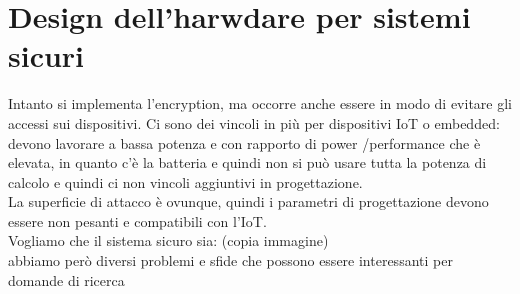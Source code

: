 \documentclass[oneside, 12pt]{extbook}
\begin{document}
\section{Design dell'harwdare per sistemi sicuri}
Intanto si implementa l'encryption, ma occorre anche essere in modo di evitare gli accessi sui dispositivi. Ci sono dei vincoli in più per dispositivi IoT o embedded: devono lavorare a bassa potenza e con rapporto di power /performance che è elevata, in quanto c'è la batteria e quindi non si può usare tutta la potenza di calcolo e quindi ci non vincoli aggiuntivi in progettazione.\\La superficie di attacco è ovunque, quindi i parametri di progettazione devono essere non pesanti e compatibili con l'IoT.\\Vogliamo che il sistema sicuro sia: (copia immagine)\\abbiamo però diversi problemi e sfide che possono essere interessanti per domande di ricerca 
\end{document}
